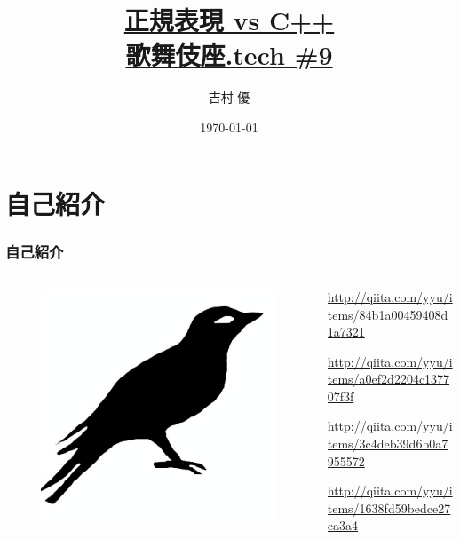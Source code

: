 \documentclass[12pt, unicode, svgnames]{beamer}
\title[正規表現 vs C++ 歌舞伎座.tech \#9]{%
  \href{https://github.com/y-yu/regex-slide}{%
    正規表現 vs C++ \\ {\normalsize 歌舞伎座.tech \#9}}
}
\author{吉村 優}
\date\today
\institute[\url{https://twitter.com/\_yyu\_}]{%
  \url{https://twitter.com/\_yyu\_}\\
  \url{http://qiita.com/yyu}\\
  \url{https://github.com/y-yu}\\
}
\begin{document}
\frame{\maketitle}

\section{自己紹介}
\begin{frame}[fragile]
  \frametitle{自己紹介}
  
  \begin{columns}
    \begin{column}{0.3\textwidth}
      \centering
      \begin{figure}
        \includegraphics[width=.7\textwidth]{img/bird2x.png}
      \end{figure}
    \end{column}
    \begin{column}{0.7\textwidth}
      \begin{Ldescription}
        \small
        \item<2->[VM型の正規表現エンジンを実装する]
          \url{http://qiita.com/yyu/items/84b1a00459408d1a7321}
        \item<3->[正規表現からLLVMへのコンパイラを実装する]
          \url{http://qiita.com/yyu/items/a0ef2d2204c137707f3f}
        \item<4->[正規表現のJITコンパイラを実装する]
          \url{http://qiita.com/yyu/items/3c4deb39d6b0a7955572}
        \item<5->[正規表現の微分でサブマッチング]
          \url{http://qiita.com/yyu/items/1638fd59bedce27ca3a4}
      \end{Ldescription}
    \end{column}
  \end{columns}
\end{frame}
\end{document}
